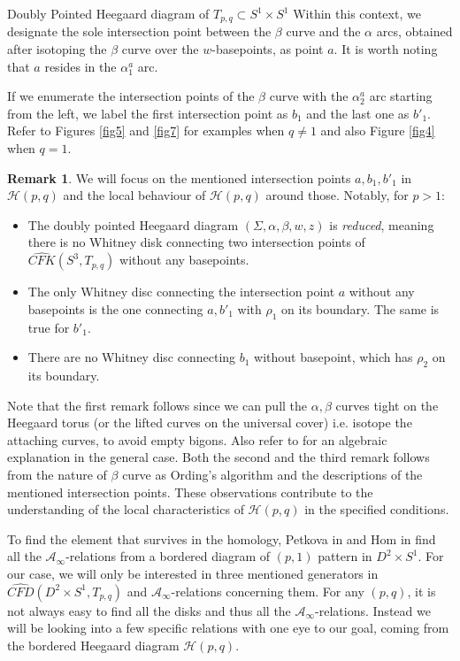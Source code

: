 \documentclass[11pt,reqno]{amsart}
\theoremstyle{definition}
\newtheorem *{remark}{Remark}
\begin{document}
\begin{subsection}{Doubly Pointed Heegaard diagram of $T_{p,q} \subset S^1 \times S^1$}
  Within this context, we designate the sole intersection point between the $\beta$ curve and the $\alpha$ arcs, obtained after isotoping the $\beta$ curve over the $w$-basepoints, as point $a$. It is worth noting that $a$ resides in the $\alpha^a_1$ arc.



If we enumerate the intersection points of the $\beta$ curve with the $\alpha^a_2$ arc starting from the left, we label the first intersection point as $b_1$ and the last one as $b'_1$. Refer to Figures \ref{fig5} and \ref{fig7} for examples when $q \neq 1$ and also Figure \ref{fig4} when $q = 1$.

  \begin{remark}
  \label{remark}
      We will focus on the mentioned intersection points $a, b_1, b'_1$ in $\mathcal{H}(p,q)$ and the local behaviour of $\mathcal{H}(p,q)$ around those. Notably, for $p>1$:  
      \begin{itemize}
      \item The doubly pointed Heegaard diagram $(\Sigma, \alpha, \beta, w, z)$ is \textit{reduced}, meaning there is no Whitney disk connecting two intersection points of $\widehat{CFK}(S^3, T_{p,q})$ without any basepoints. 
          \item The only Whitney disc connecting the intersection point $a$ without any basepoints is the one connecting $a, b'_1$ with $\rho_1$ on its boundary. The same is true for $b'_1$.
          \item There are no Whitney disc connecting $b_1$ without basepoint, which has $\rho_2$ on its boundary.
      \end{itemize}

\noindent Note that the first remark follows since we can pull the $\alpha, \beta$ curves tight on the Heegaard torus (or the lifted curves on the universal cover) i.e. isotope the attaching curves, to avoid empty bigons. Also refer to \cite[Reduction Lemma]{hw18} for an algebraic explanation in the general case. Both the second and the third remark follows from the nature of $\beta$ curve as Ording's algorithm and the descriptions of the mentioned intersection points. These observations contribute to the understanding of the local characteristics of $\mathcal{H}(p,q)$ in the specified conditions.
  \end{remark}

To find the element that survives in the homology, Petkova in \cite{petkova13} and Hom in \cite{hom11} find all the $\mathcal{A}_{\infty}$-relations from a bordered diagram of $(p,1)$ pattern in $D^2 \times S^1$. For our case, we will only be interested in three mentioned generators in $\widehat{CFD}(D^2 \times S^1, T_{p,q})$ and $\mathcal{A}_{\infty}$-relations concerning them. For any $(p,q)$, it is not always easy to find all the disks and thus all the $\mathcal{A}_{\infty}$-relations. Instead we will be looking into a few specific relations with one eye to our goal, coming from the bordered Heegaard diagram $\mathcal{H}(p,q)$.







\end{subsection}
\end{document}
